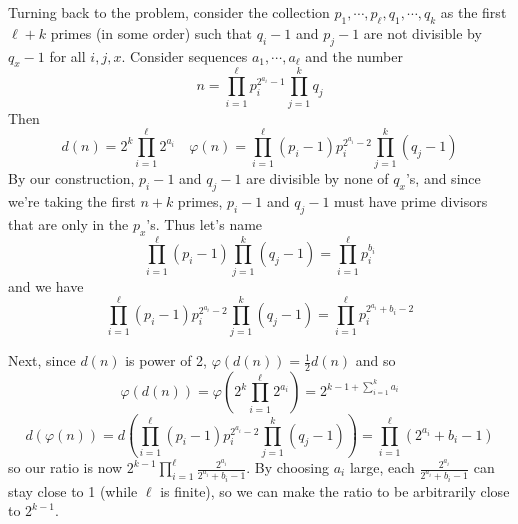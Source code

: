 \documentclass[11pt,a4paper]{article}
\begin{document}
\begin{enumerate}
\begin{enumerate}
		Turning back to the problem, 
		consider the collection $p_1, \cdots, p_{\ell}, q_1, \cdots, q_k$ as the first ${\ell}+k$ primes (in some order)
		such that $q_i-1$ and $p_j-1$ are not divisible by $q_{x}-1$ for all $i, j, x$. 
		Consider sequences $a_1, \cdots, a_{\ell}$ and the number 
		\[
		n = \prod_{i=1}^{\ell}p_i^{2^{a_i}-1}\prod_{j=1}^{k}q_j
		\]
		Then 
		\[
		d(n) = 2^k\prod_{i=1}^{\ell}2^{a_i}
		\quad 
		\varphi(n) = \prod_{i=1}^{\ell}(p_i-1)p_i^{2^{a_i}-2}\prod_{j=1}^{k}(q_j-1)
		\]
		By our construction, $p_i-1$ and $q_j-1$ are divisible by none of $q_x$'s, and since we're taking the first $n+k$ primes, $p_i-1$ and $q_j-1$ must have prime divisors that are only in the $p_x$'s. 
		Thus let's name 
		\[
		\prod_{i=1}^{\ell}(p_i-1)
		\prod_{j=1}^{k}(q_j-1)
		=\prod_{i=1}^{\ell}p_i^{b_i}
		\]
		and we have 
		\[\prod_{i=1}^{\ell}(p_i-1)p_i^{2^{a_i}-2}\prod_{j=1}^{k}(q_j-1)
		=\prod_{i=1}^{\ell}p_i^{2^{a_i}+b_i-2}
		\]
		
		Next, since $d(n)$ is power of 2, $\varphi(d(n))=\frac 12 d(n)$ and so 
		\[\varphi(d(n)) = \varphi(2^k\prod_{i=1}^{\ell}2^{a_i})=2^{k-1+\sum_{i=1}^{k}a_i}
		\]\[
		d(\varphi(n))
		=d\left(\prod_{i=1}^{\ell}(p_i-1)p_i^{2^{a_i}-2}\prod_{j=1}^{k}(q_j-1)\right)
		=\prod_{i=1}^{\ell} (2^{a_i}+b_i-1)
		\]
		so our ratio is now $2^{k-1}\prod_{i=1}^{\ell}\frac{2^{a_i}}{2^{a_i}+b_i-1}$. 
		By choosing $a_i$ large, each $\frac{2^{a_i}}{2^{a_i}+b_i-1}$ can stay close to 1 (while $\ell$ is finite), 
		so we can make the ratio to be arbitrarily close to $2^{k-1}$. 
	\end{enumerate}
\end{enumerate}
\end{document}
